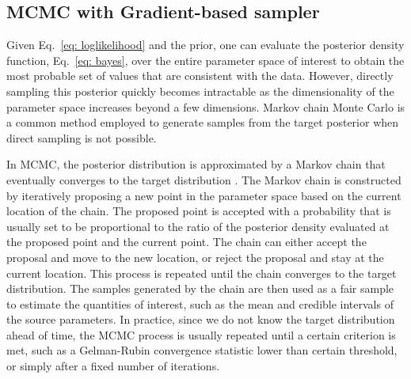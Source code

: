 \documentclass[twocolumn]{aastex631}
\begin{document}
\subsection{MCMC with Gradient-based sampler}
\label{sec:gradient}

Given Eq.~\eqref{eq: loglikelihood} and the prior, one can evaluate the
posterior density function, Eq.~\eqref{eq: bayes}, over the entire parameter
space of interest to obtain the most probable set of values that are consistent
with the data. However, directly sampling this posterior quickly becomes
intractable as the dimensionality of the parameter space increases beyond a few
dimensions. Markov chain Monte Carlo \cite{gelmanbda04} is a common
method employed to generate samples from the target posterior when direct
sampling is not possible.

In MCMC, the posterior distribution is approximated by a Markov chain that eventually
converges to the target distribution \cite{10.1214/aos/1176325750}. The Markov
chain is constructed by iteratively proposing a new point in the parameter space
based on the current location of the chain. The proposed point is accepted with
a probability that is usually set to be proportional to the ratio of the
posterior density evaluated at the proposed point and the current point. The
chain can either accept the proposal and move to the new location, or reject the
proposal and stay at the current location. This process is repeated until the
chain converges to the target distribution. The samples generated by the chain
are then used as a fair sample to estimate the quantities of interest, such as the mean and
credible intervals of the source parameters. In practice, since we do not know
the target distribution ahead of time, the MCMC process is usually repeated
until a certain criterion is met, such as a Gelman-Rubin convergence statistic
\cite{10.2307/2246093} lower than certain threshold, or simply after a fixed number
of iterations.
\end{document}
